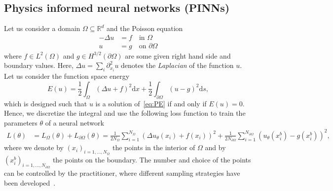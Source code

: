 \subsection{Physics informed neural networks (PINNs)}
Let us consider a domain $\Omega\subseteq\mathbb R^d$ and the Poisson equation %
\begin{align*}\tag{PE}\label{eq:PE}
  -\Delta u & = f \quad \text{in }\Omega \\
  u & = g \quad \text{on }\partial\Omega
\end{align*}
where $f\in L^2(\Omega)$ and $g\in H^{3/2}(\partial\Omega)$ are some given right hand side and boundary values.
Here, $\Delta u = \sum_i \partial_{x_i}^2 u$ denotes the \emph{Laplacian} of the function $u$. 
Let us consider the function space energy 
  \[ E(u) = \frac{1}{2} \int_\Omega (\Delta u + f)^2 \mathrm dx + \frac12 \int_{\partial\Omega} (u-g)^2 \mathrm ds, \]
which is designed such that $u$ is a solution of~\eqref{eq:PE} if and only if $E(u)=0$. 
Hence, we discretize the integral and use the following loss function to train the parameters $\theta$ of a neural network
\begin{align*}
  L(\theta)
  &=
    L_\Omega(\theta) + %
    L_{\partial\Omega}(\theta)
  =
    \frac{1}{2N_\Omega} \sum_{i=1}^{N_\Omega} (\Delta u_\theta(x_i) + f(x_i))^2 + \frac{1}{2N_{\partial\Omega}}\sum_{i=1}^{N_{\partial\Omega}} ( u_\theta(x^b_i) - g(x^b_i))^2,
\end{align*}
where we denote by $(x_i)_{i=1,\dots,N_\Omega}$ the points in the interior of $\Omega$ and by $(x^b_i)_{i=1,\dots,N_{\partial\Omega}}$ the points on the boundary.
The number and choice of the points can be controlled by the practitioner, where different sampling strategies have been developed~\cite[text]{keylist}.

